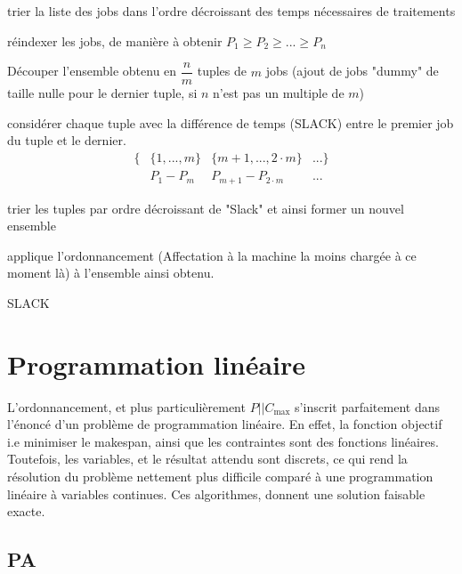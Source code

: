 \documentclass[a4paper,12pt]{report}
\theoremstyle{plain}				%
\theoremstyle{definition}				%
\newcommand\problemGrahamP{$P||C_{\max}$\xspace}
\begin{document}
\bigskip
\begin{algorithm}[H]
\DontPrintSemicolon

trier la liste des jobs dans l'ordre décroissant des temps nécessaires de traitements

\BlankLine %
réindexer les jobs, de manière à obtenir $P_1 \geq P_2 \geq ... \geq P_n$

\BlankLine %
Découper l'ensemble obtenu en $\dfrac{n}{m}$ tuples de $m$ jobs (ajout
de jobs "dummy" de taille nulle pour le dernier tuple, si $n$ n'est
pas un multiple de $m$)

\BlankLine %
considérer chaque tuple avec la différence de temps (SLACK) entre le
premier job du tuple et le dernier.
\begin{align*}
\{ &\{1, ..., m\} &\{m+1,..., 2 \cdot m\} &... \} \\
   &P_1 - P_m     &P_{m+1}-P_{2 \cdot m}  &...
\end{align*}


\BlankLine %
trier les tuples par ordre décroissant de "Slack" et ainsi former un nouvel ensemble

\BlankLine %
applique l'ordonnancement (Affectation à la machine la moins chargée à ce moment là) à l'ensemble ainsi obtenu.

\caption{SLACK\label{algo:SLACK}}
\end{algorithm}

\section{Programmation linéaire}

L'ordonnancement, et plus particulièrement \problemGrahamP s'inscrit
parfaitement dans l'énoncé d'un problème de programmation linéaire.
En effet, la fonction objectif i.e minimiser le makespan, ainsi que
les contraintes sont des fonctions linéaires.
Toutefois, les variables, et le résultat attendu sont discrets, ce qui
rend la résolution du problème nettement plus difficile comparé à une
programmation linéaire à variables continues.
Ces algorithmes, donnent une solution faisable exacte.

\subsection{PA} %
\end{document}
